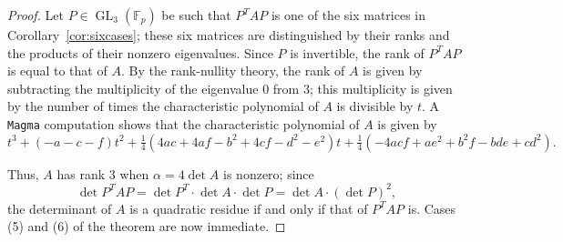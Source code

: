 \documentclass[10pt,a4paper]{amsart}
\numberwithin{equation}{section}
\numberwithin{figure}{section}
\theoremstyle{definition}
\theoremstyle{remark}
\theoremstyle{plain}
\theoremstyle{plain}
\theoremstyle{definition}
\theoremstyle{plain}
\theoremstyle{plain}
\newcommand{\F}{\mathbb{F}}
\newcommand{\GL}{\operatorname{GL}}
\begin{document}
\begin{proof}
Let $P\in\GL_3(\F_p)$ be such that $P^TAP$ is one of the six matrices in Corollary~\ref{cor:sixcases}; these six matrices are distinguished by their ranks and the products of their nonzero eigenvalues. Since $P$ is invertible, the rank of $P^TAP$ is equal to that of $A$. By the rank-nullity theory, the rank of $A$ is given by subtracting the multiplicity of the eigenvalue $0$ from $3$; this multiplicity is given by the number of times the characteristic polynomial of $A$ is divisible by $t$. A \texttt{Magma} \cite{magma} computation shows that the characteristic polynomial of $A$ is given by
\begin{equation*}
t^3+(-a-c-f)t^2+\tfrac{1}{4}(4ac+4af-b^2+4cf-d^2-e^2)t+\tfrac{1}{4}(-4acf+ae^2+b^2f-bde+cd^2).
\end{equation*}

Thus, $A$ has rank $3$ when $\alpha=4\det A$ is nonzero; since
\begin{equation*}
\det P^TAP=\det P^T\cdot\det A\cdot\det P=\det A\cdot(\det P)^2,
\end{equation*}
the determinant of $A$ is a quadratic residue if and only if that of $P^TAP$ is. Cases (5) and (6) of the theorem are now immediate.


\end{proof}
\end{document}
